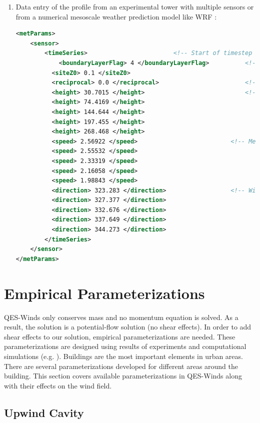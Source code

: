 \begin{enumerate}
\item Data entry of the profile from an experimental tower with multiple sensors or from a numerical mesoscale weather prediction model like WRF \cite{powers2017weather}:

\begin{lstlisting}[language=XML]
<metParams>
	<sensor>
	    <timeSeries>						<!-- Start of timestep informastion for a sensor -->
       		<boundaryLayerFlag> 4 </boundaryLayerFlag> 			<!-- Site boundary layer flag (1-log, 2-exp, 3-urban canopy, 4-data entry) -->
          <siteZ0> 0.1 </siteZ0> 									<!-- Site z0 -->
          <reciprocal> 0.0 </reciprocal> 						<!-- Reciprocal Monin-Obukhov Length (1/m) -->
          <height> 30.7015 </height> 							<!-- Height of the sensor -->
          <height> 74.4169 </height>
          <height> 144.644 </height>
          <height> 197.455 </height>
          <height> 268.468 </height>
          <speed> 2.56922 </speed> 							<!-- Measured speed at the sensor height -->
          <speed> 2.55532 </speed>
          <speed> 2.33319 </speed>
          <speed> 2.16058 </speed>
          <speed> 1.98843 </speed>
          <direction> 323.283 </direction> 					<!-- Wind direction of sensor -->
          <direction> 327.377 </direction>
          <direction> 332.676 </direction>
          <direction> 337.649 </direction>
          <direction> 344.273 </direction>
    	</timeSeries>
	</sensor>
</metParams>
\end{lstlisting}

\end{enumerate}

\section{Empirical Parameterizations}

QES-Winds only conserves mass and no momentum equation is solved. As a result, the solution is a potential-flow solution (no shear effects). In order to add shear effects to our solution, empirical parameterizations are needed. These parameterizations are designed using results of experiments and computational simulations (e.g. \cite{singh2008evaluation, brown2013quic}). Buildings are the most important elements in urban areas. There are several parameterizations developed for different areas around the building. This section covers available parameterizations in QES-Winds along with their effects on the wind field.

\subsection{Upwind Cavity}

